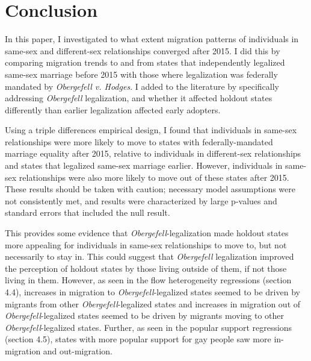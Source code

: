 \documentclass[12pt,letterpaper]{article}
\begin{document}
\FloatBarrier %
\section{Conclusion}

In this paper, I investigated to what extent migration patterns of individuals in same-sex and different-sex relationships converged after 2015. I did this by comparing migration trends to and from states that independently legalized same-sex marriage before 2015 with those where legalization was federally mandated by \textit{Obergefell v. Hodges}. I added to the literature by specifically addressing \textit{Obergefell} legalization, and whether it affected holdout states differently than earlier legalization affected early adopters.

Using a triple differences empirical design, I found that individuals in same-sex relationships were more likely to move to states with federally-mandated marriage equality after 2015, relative to individuals in different-sex relationships and states that legalized same-sex marriage earlier. However, individuals in same-sex relationships were also more likely to move out of these states after 2015. These results should be taken with caution; necessary model assumptions were not consistently met, and results were characterized by large p-values and standard errors that included the null result.

This provides some evidence that \textit{Obergefell}-legalization made holdout states more appealing for individuals in same-sex relationships to move to, but not necessarily to stay in. This could suggest that \textit{Obergefell} legalization improved the perception of holdout states by those living outside of them, if not those living in them. However, as seen in the flow heterogeneity regressions (section 4.4), increases in migration to \textit{Obergefell}-legalized states seemed to be driven by migrants from other \textit{Obergefell}-legalized states and increases in migration out of \textit{Obergefell}-legalized states seemed to be driven by migrants moving to other \textit{Obergefell}-legalized states. Further, as seen in the popular support regressions (section 4.5), states with more popular support for gay people saw more in-migration and out-migration.
\end{document}
